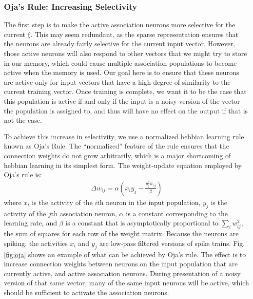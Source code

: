\documentclass[10pt,letterpaper]{article}
\begin{document}

\subsubsection{Oja's Rule: Increasing Selectivity}
The first step is to make the active association neurons more selective for the current $\xi$. This may seem redundant, as the sparse representation ensures that the neurons are already fairly selective for the current input vector. However, those active neurons will also respond to other vectors that we might try to store in our memory, which could cause multiple association populations to become active when the memory is used. Our goal here is to ensure that these neurons are active only for input vectors that have a high-degree of similarity to the current training vector. Once training is complete, we want it to be the case that this population is active if and only if the input is a noisy version of the vector the population is assigned to, and thus will have no effect on the output if that is not the case.

To achieve this increase in selectivity, we use a normalized hebbian learning rule known as Oja's Rule. The ``normalized'' feature of the rule ensures that the connection weights do not grow arbitrarily, which is a major shortcoming of hebbian learning in its simplest form. The weight-update equation employed by Oja's rule is:
\begin{align}
  \Delta w_{ij} = \alpha (x_i y_j - \frac{y_j^2 w_{ij}}{\beta})
\end{align}
where $x_i$ is the activity of the $i$th neuron in the input population, $y_j$ is the activity of the $j$th association neuron, $\alpha$ is a constant corresponding to the learning rate, and $\beta$ is a constant that is asymptotically proportional to $\sum_i w_{ij}^2$, the sum of squares for each row of the weight matrix. Because the neurons are spiking, the activities $x_i$ and $y_j$ are low-pass filtered versions of spike trains. Fig. \ref{fig:oja} shows an example of what can be achieved by Oja's rule. The effect is to increase connection weights between neurons on the input population that are currently active, and active association neurons. During presentation of a noisy version of that same vector, many of the same input neurons will be active, which should be sufficient to activate the association neurons.
\end{document}
